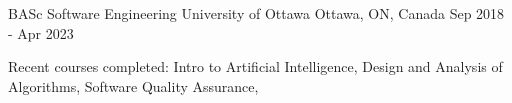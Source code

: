 
\begin{cventries}

  \cventry
    {BASc Software Engineering} %
    {University of Ottawa} %
    {Ottawa, ON, Canada} %
    {Sep 2018 - Apr 2023} %
    {
    \begin{cvitems} %
        \item {Recent courses completed: Intro to Artificial Intelligence, Design and Analysis of Algorithms, Software Quality Assurance,}
    \end{cvitems}
    }
\vspace{-0.3cm}

\end{cventries}

